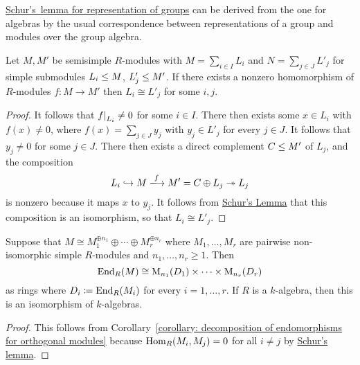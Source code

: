 \begin{remark}
  \hyperref[proposition: Schurs lemma representations]{Schur’s~lemma for representation of groups} can be derived from the one for algebras by the usual correspondence between representations of a group and modules over the group algebra.
\end{remark}


\begin{corollary}
  \label{corollary: no nonzero homomorphisms between disjoint semisimple modules}
  Let $M, M'$ be semisimple $R$-modules with $M = \sum_{i \in I} L_i$ and $N = \sum_{j \in J} L'_j$ for simple submodules $L_i \leq M$, $L'_j \leq M'$.
  If there exists a nonzero homomorphism of $R$-modules $f \colon M \to M'$ then $L_i \cong L'_j$ for some $i, j$.
\end{corollary}


\begin{proof}
  It follows that $\restrict{f}{L_i} \neq 0$ for some $i \in I$.
  There then exists some $x \in L_i$ with $f(x) \neq 0$, where $f(x) = \sum_{j \in J} y_j$ with $y_j \in L'_j$ for every $j \in J$.
  It follows that $y_j \neq 0$ for some $j \in J$.
  There then exists a direct complement $C \leq M'$ of $L_j$, and the composition
  \[
                        L_i
    \inclusion          M
    \xlongrightarrow{f} M'
    =                   C \oplus L_j
    \projection         L_j
  \]
  is nonzero because it maps $x$ to $y_j$.
  It follows from \hyperref[proposition: schurs lemma for modules]{Schur’s Lemma} that this composition is an isomorphism, so that $L_i \cong L'_j$.
\end{proof}


\begin{corollary}
  \label{corollary: End is isomorphic to product of matrix rings Schur style}
  Suppose that $M \cong M_1^{\oplus n_1} \oplus \dotsb \oplus M_r^{\oplus n_r}$ where $M_1, \dotsc, M_r$ are pairwise non-isomorphic simple $R$-modules and $n_1, \dotsc, n_r \geq 1$.
  Then
  \[
          \operatorname{End}_R(M)
    \cong \operatorname{M}_{n_1}(D_1) \times \dotsb \times \operatorname{M}_{n_r}(D_r)
  \]
  as rings where $D_i \coloneqq \operatorname{End}_R(M_i)$ for every $i = 1, \dotsc, r$.
  If $R$ is a $k$-algebra, then this is an isomorphism of $k$-algebras.
\end{corollary}


\begin{proof}
  This follows from Corollary~\ref{corollary: decomposition of endomorphisms for orthogonal modules} because $\operatorname{Hom}_R(M_i, M_j) = 0$ for all $i \neq j$ by \hyperref[proposition: schurs lemma for modules]{Schur’s lemma}.
\end{proof}



